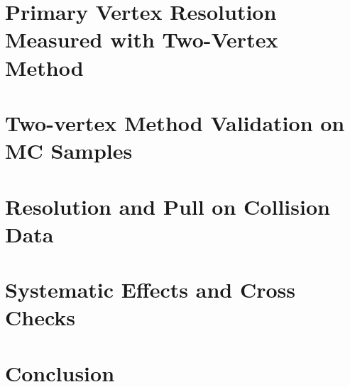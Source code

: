 \documentclass{cmspaper}
\begin{document}
\section{Primary Vertex Resolution Measured with Two-Vertex Method}
\label{sec:twovertex}

\clearpage

\section{Two-vertex Method Validation on MC Samples}
\label{sec:mcvalidation}

\clearpage

\section{Resolution and Pull on Collision Data}
\label{sec:dataresults}

\clearpage

\section{Systematic Effects and Cross Checks}
\label{sec:systematics}

\clearpage

\section{Conclusion}
\label{sec:conclusion}



\end{document}
